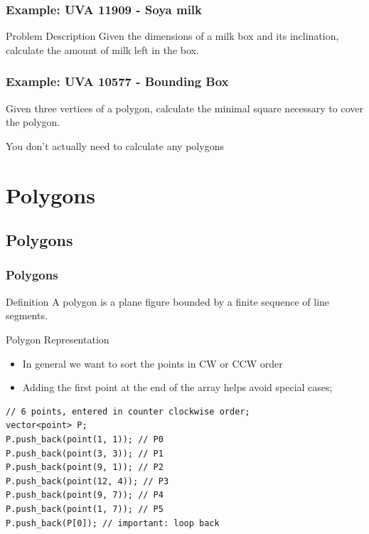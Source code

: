 \documentclass{beamer}
\begin{document}
\begin{frame}
  \frametitle{Example: UVA 11909 - Soya milk}
  \begin{block}{Problem Description}
    Given the dimensions of a milk box and its inclination, calculate
    the amount of milk left in the box.
  \end{block}
\end{frame}

\begin{frame}
  \frametitle{Example: UVA 10577 - Bounding Box}
  \begin{block}{}
    Given three vertices of a  polygon,
    calculate the minimal square necessary to cover the polygon.
  \end{block}


  \bigskip
  
  {\smaller

     You don't actually need to calculate any polygons
  }
\end{frame}

\section{Polygons}
\subsection{Polygons}
\begin{frame}[fragile]
  \frametitle{Polygons}
  {\smaller    
  \begin{block}{Definition}
    A polygon is a plane figure bounded by a finite sequence of line
    segments.
  \end{block}

  \begin{exampleblock}{Polygon Representation}
    \begin{itemize}
    \item In general we want to sort the points in CW or CCW order
    \item Adding the first point at the end of the array helps avoid
      special cases;
    \end{itemize}
\begin{verbatim}
// 6 points, entered in counter clockwise order;
vector<point> P;
P.push_back(point(1, 1)); // P0
P.push_back(point(3, 3)); // P1
P.push_back(point(9, 1)); // P2
P.push_back(point(12, 4)); // P3
P.push_back(point(9, 7)); // P4
P.push_back(point(1, 7)); // P5
P.push_back(P[0]); // important: loop back
\end{verbatim}
\end{exampleblock}
  }

\end{frame}
\end{document}
